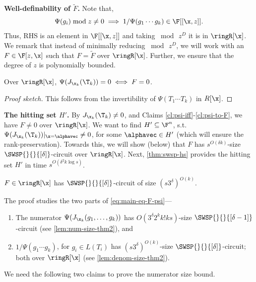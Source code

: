 \textbf{Well-definability of $\widetilde{F}$.} Note that, \[\Psi(g_i) \bmod z \ne 0 \implies 1/\Psi(g_1 \cdots g_k) \in \F[[\x,z]].\] Thus, RHS is an element in $\F[[\x,z]]$ and taking $\bmod\, z^D$ it is in $\ringR[\x]$. We remark that instead of minimally reducing $\bmod\,z^D$, we will work with an $F \in \F[z,\x]$ such that    $F=\tilde{F}$ over $\ringR[\x]$. Further, we ensure that the degree of $z$ is polynomially bounded.

\begin{claim}\label{cl:psi-to-F}
Over $\ringR[\x]$, $\Psi(J_{{\x}_k}(\T_k)) = 0  \iff F =0$.  
\end{claim}

\begin{proof}[Proof sketch]
This follows from the invertibility of $\Psi(T_1 \cdots T_k)$ in $R[\x]$.
%
\end{proof}

\textbf{The hitting set $H'$.} By $J_{\x_k}(\T_k) \ne 0$, and Claims \ref{cl:psi-iff}-\ref{cl:psi-to-F}, we have $F \ne 0$ over $\ringR[\x]$. We want to find $H' \subseteq \F^{n}$, s.t.~$\Psi(J_{\x_k}(\T_k))\rvert_{\x=\alphavec} \ne 0$, for some $\alphavec \in H'$ (which will ensure the rank-preservation). 
Towards this, we will show (below) that $F$ has $s^{O(\delta k)}$-size $\SWSP{}{}{[\delta]}$-circuit over $\ringR[\x]$. Next, \autoref{thm:swsp-hs} provides the hitting set $H'$ in time $s^{O(\delta^2 k \log s)}$. 


%

\begin{claim}\label{claim:small-size-F-swsp}
$F \in \ringR[\x]$ has $\SWSP{}{}{[\delta]}$-circuit of size $ (s3^{\delta})^{O(k)}$.
\end{claim}

%
\noindent The proof studies the two parts of \autoref{eq:main-eq-F-psi}---
\begin{enumerate}
    \item The numerator $\Psi(J_{{\x}_k}(g_1,\hdots,g_k))$ has $O(3^{\delta}2^kk!ks)$-size $\SWSP{}{}{[\delta-1]}$-circuit (see \autoref{lem:num-size-thm2}), and
    \item $1/\Psi(g_1 \cdots g_k)$, for $g_i \in L(T_i)$ has $(s3^{\delta})^{O(k)}$-size $\SWSP{}{}{[\delta]}$-circuit; both over $\ringR[\x]$ (see \autoref{lem:denom-size-thm2}).
\end{enumerate}

\noindent We need the following two claims to prove the numerator size bound.

